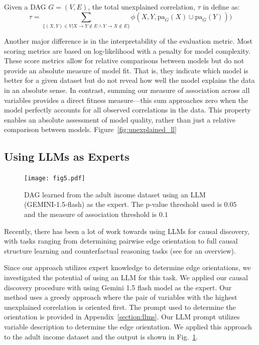 \documentclass{uai2025} %
\begin{document}
Given a DAG $ G = (V, E) $, the total unexplained correlation, $\tau$ in define as:
\begin{equation}
	\tau = \sum_{\{ (X, Y) \in V | X \rightarrow Y \not \in E \wedge Y \rightarrow X \not \in E \} } \phi(X, Y, \mathrm{pa}_G(X) \cup \mathrm{pa}_G(Y)))
\end{equation}

Another major difference is in the interpretability of the evaluation metric.
Most scoring metrics are based on log-likelihood with a penalty for model
complexity. These score metrics allow for relative comparisons between models
but do not provide an absolute measure of model fit. That is, they indicate
which model is better for a given dataset but do not reveal how well the model
explains the data in an absolute sense. In contrast, summing our measure of
association across all variables provides a direct fitness measure—this sum
approaches zero when the model perfectly accounts for all observed correlations
in the data. This property enables an absolute assessment of model quality,
rather than just a relative comparison between models. Figure~\ref{fig:unexplained_ll}


\subsection{Using LLMs as Experts}
 
\begin{figure}[t!]
	\centering
	\texttt{[image: fig5.pdf]}
	\caption{DAG learned from the adult income dataset using an LLM (GEMINI-1.5-flash) as the expert. The p-value threshold used is $ 0.05 $ and the measure of association threshold is $ 0. 1 $}
	\label{fig:adult_llm}
\end{figure}
Recently, there has been a lot of work towards using LLMs for causal discovery,
with tasks ranging from determining pairwise edge orientation
\citep{Kiciman2023, Jin2024} to full causal structure learning \citep{Naik2023,
Vashishtha2023} and counterfactual reasoning tasks\citep{Kiciman2023} (see
\citet{Liu2024} for an overview).

Since our approach utilizes expert knowledge to determine edge orientations, we
investigated the potential of using an LLM for this task. We applied our causal
discovery procedure with using Gemini 1.5 flash model as the expert. Our method
uses a greedy approach where the pair of variables with the highest unexplained
correlation is oriented first. The prompt used to determine the orientation is
provided in Appendix~\ref{section:llms}. Our LLM prompt utilizes variable
description to determine the edge orientation. We applied this approach to the
adult income dataset and the output is shown in Fig.~\ref{fig:adult_llm}. 
\end{document}
